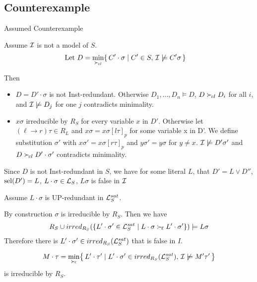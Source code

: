 \documentclass[%
handout,
]{beamer}
\begin{document}
\subsection{Counterexample}
\begin{frame}[allowframebreaks]{Assumed Counterexample}
    
    Assume $\mathcal{I}$ is not a model of $S$.
    \begin{align*}
        \text{Let }
        D &= \min_{\mathrel\succ_{\!cl}}\{\,
        C'\cdot\sigma \mid C'\in S,\,
        \mathcal{I}\not\models C'\sigma\,
        \}
    \end{align*}

    Then
    \begin{itemize}
        \item $D = D'\cdot\sigma$ is not Inst-redundant. Otherwise
        $D_1,\ldots,D_n\models D$, $D\mathrel\succ_{\!cl} D_i$ for all $i$,
        and $\mathcal{I}\not\models D_j$ for one $j$ contradicts minimality.
        \item $x\sigma$ irreducible by $R_S$ for every variable $x$ in $D'$.
        Otherwise let $(\ell\to r)\tau\in R_L$ and $x\sigma = x\sigma[l\tau]_p$ for some variable x in D'.
        We define substitution $\sigma'$ with $x\sigma' = x\sigma[r\tau]_p$ and $y\sigma' = y\sigma$ for $y\neq x$.
        $\mathcal{I}\not\models D'\sigma'$ and $D\mathrel\succ_{\!cl} D'\cdot\sigma'$ contradicts minimality.
    \end{itemize}



    Since $D$ is not Inst-redundant in $S$,
    we have for some literal $L$,
    that $D' = L\lor D''$, $\operatorname{sel}(D') = L$, $L\cdot\sigma\in\mathcal{L}_S$,
    $L\sigma$ is false in $\mathcal{I}$

    Assume $L\cdot\sigma$ is UP-redundant in $\mathcal{L}_S^{sat}$.

    By construction $\sigma$ is irreducible by $R_S$. Then we have
    \begin{align*}
        R_S \cup irred_{R_S}(
            \{
            L'\cdot\sigma'\in\mathcal{L}_S^{sat}
            \mid
            L\cdot\sigma \mathrel\succ_{\!\ell} L'\cdot\sigma'
            \}
        )
        \models
        L\sigma
    \end{align*}
    Therefore there is $L'\cdot\sigma'\in irred_{R_S}(\mathcal{L}_S^{sat})$ that is false in $I$.
    \vspace{0.7em}


    \begin{gather*}
        M\cdot\tau = \min_{\mathrel\succ_{\!\ell}}\!
\left\{\,
    L'\cdot\tau' \mid
    L'\cdot\sigma' \in irred_{R_S}(\mathcal{L}_S^{sat}),\,
    \mathcal{I} \not\models M'\tau'\,
\right\}
    \end{gather*}
    is irreducible by $R_S$.


\end{frame}
\end{document}
